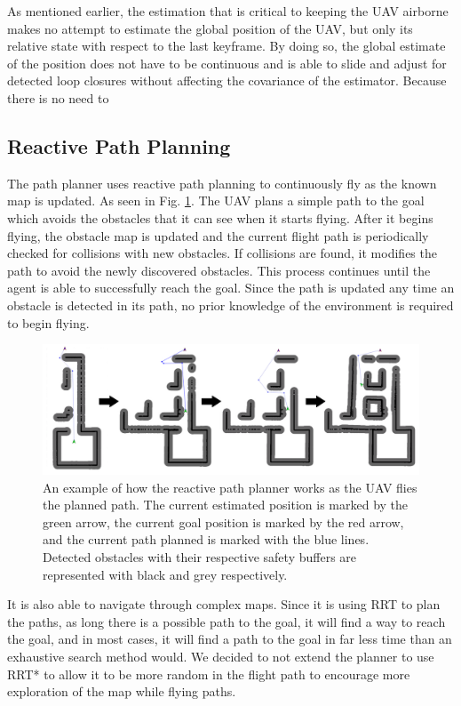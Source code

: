 \documentclass[letterpaper, 10 pt, conference]{ieeeconf}  %
\begin{document}
As mentioned earlier, the estimation that is critical to keeping the UAV airborne makes no attempt to estimate the global position of the UAV, but only its relative state with respect to the last keyframe. By doing so, the global estimate of the position does not have to be continuous and is able to slide and adjust for detected loop closures without affecting the covariance of the estimator. Because there is no need to

\subsection{Reactive Path Planning}

The path planner uses reactive path planning to continuously fly as the known map is updated. As seen in Fig. \ref{fig:reactive_plan}. The UAV plans a simple path to the goal which avoids the obstacles that it can see when it starts flying. After it begins flying, the obstacle map is updated and the current flight path is periodically checked for collisions with new obstacles. If collisions are found, it modifies the path to avoid the newly discovered obstacles. This process continues until the agent is able to successfully reach the goal. Since the path is updated any time an obstacle is detected in its path, no prior knowledge of the environment is required to begin flying.

\begin{figure}
\centering
\includegraphics[width=1.0\linewidth]{adaptive_path_plan2.png}
\caption{An example of how the reactive path planner works as the UAV flies the planned path. The current estimated position is marked by the green arrow, the current goal position is marked by the red arrow, and the current path planned is marked with the blue lines. Detected obstacles with their respective safety buffers are represented with black and grey respectively.}
\label{fig:reactive_plan}
\end{figure}

It is also able to navigate through complex maps. Since it is using RRT to plan the paths, as long there is a possible path to the goal, it will find a way to reach the goal, and in most cases, it will find a path to the goal in far less time than an exhaustive search method would. We decided to not extend the planner to use RRT* to allow it to be more random in the flight path to encourage more exploration of the map while flying paths.
\end{document}

